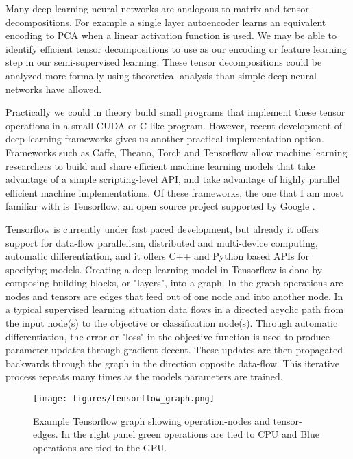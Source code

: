 Many deep learning neural networks are analogous to matrix and tensor decompositions. For example a single layer autoencoder learns an equivalent encoding to PCA when a linear activation function is used\cite{hinton2006reducing}. We may be able to identify efficient tensor decompositions to use as our encoding or feature learning step in our semi-supervised learning. These tensor decompositions could be analyzed more formally using theoretical analysis than simple deep neural networks have allowed.

Practically we could in theory build small programs that implement these tensor operations in a small CUDA or C-like program. However, recent development of deep learning frameworks gives us another practical implementation option. Frameworks such as Caffe, Theano, Torch and Tensorflow allow machine learning researchers to build and share efficient machine learning models that take advantage of a simple scripting-level API, and take advantage of highly parallel efficient machine implementations. Of these frameworks, the one that I am most familiar with is Tensorflow, an open source project supported by Google \cite{abadi2016tensorflow}. 

Tensorflow is currently under fast paced development, but already it offers support for data-flow parallelism, distributed and multi-device computing, automatic differentiation, and it offers C++ and Python based APIs for specifying models. Creating a deep learning model in Tensorflow is done by composing building blocks, or "layers", into a graph. In the graph operations are nodes and tensors are edges that feed out of one node and into another node. In a typical supervised learning situation data flows in a directed acyclic path from the input node(s) to the objective or classification node(s). Through automatic differentiation, the error or "loss" in the objective function is used to produce parameter updates through gradient decent. These updates are then propagated backwards through the graph in the direction opposite data-flow. This iterative process repeats many times as the models parameters are trained.

\begin{figure*}
\centering
\texttt{[image: figures/tensorflow\_graph.png]}
\caption{Example Tensorflow graph showing operation-nodes and tensor-edges. In the right panel green operations are tied to CPU and Blue operations are tied to the GPU.}
\label{fig:lda}
\end{figure*}

